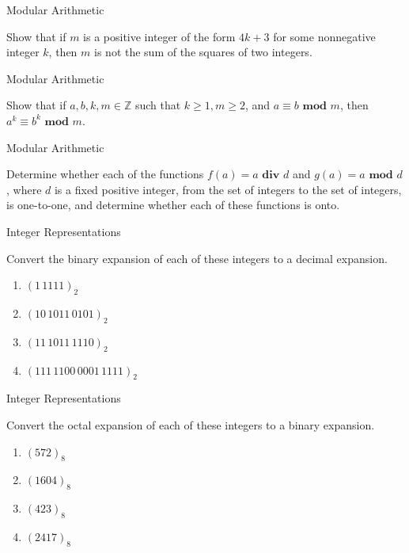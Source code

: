 \documentclass{beamer}
\renewcommand{\mod}{\textbf{ mod }}
\renewcommand{\div}{\textbf{ div }}
\begin{document}
\begin{frame}[t]{Modular Arithmetic}
    \begin{example}
        Show that if $m$ is a positive integer of the form $4k+3$ for some nonnegative integer $k$, then $m$ is not the sum of the squares of two integers. 
    \end{example}
\end{frame}

\begin{frame}[t]{Modular Arithmetic}
    \begin{example}
        Show that if $a,b,k,m \in \mathbb{Z}$ such that $k \geq 1, m\geq 2$, and $a \equiv b \mod m$, then $a^k \equiv b^k \mod m$.
    \end{example}
\end{frame}

\begin{frame}[t]{Modular Arithmetic}
    \begin{example}
        Determine whether each of the functions $f(a) = a \div d$ and $g(a) = a \mod d$, where $d$ is a fixed positive integer, from the set of integers to the set of integers, is one-to-one, and determine whether each of these functions is onto. 
    \end{example}
\end{frame}

\begin{frame}[t]{Integer Representations}
    \begin{example}
        Convert the binary expansion of each of these integers to a decimal expansion. \begin{enumerate}
            \item $(1 \, 1111)_2$
            \item $(10 \, 1011 \, 0101)_2$
            \item $(11 \, 1011 \, 1110)_2$
            \item $(111 \, 1100 \, 0001 \, 1111)_2$
        \end{enumerate}
    \end{example}
\end{frame}

\begin{frame}[t]{Integer Representations}
    \begin{example}
        Convert the octal expansion of each of these integers to a binary expansion. \begin{enumerate}
            \item $(572)_8$
            \item $(1604)_8$
            \item $(423)_8$
            \item $(2417)_8$
        \end{enumerate}
    \end{example}
\end{frame}
\end{document}
